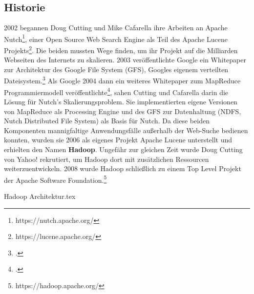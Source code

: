 \subsection{Historie}
2002 begannen Doug Cutting und Mike Cafarella ihre Arbeiten an Apache Nutch\footnote{https://nutch.apache.org/}, einer Open Source Web Search Engine als Teil des Apache Lucene Projekts\footnote{https://lucene.apache.org/}. Die beiden mussten Wege finden, um ihr Projekt auf die Milliarden Webseiten des Internets zu skalieren. 2003 veröffentlichte Google ein Whitepaper zur Architektur des Google File System (GFS), Googles eigenem verteilten Dateisystem.\footcite[The Google File System]{ghemawat_google_2003} Als Google 2004 dann ein weiteres Whitepaper zum MapReduce Programmiermodell veröffentlichte\footcite[MapReduce: Simplified Data Processing on Large Clusters]{dean_mapreduce_2004}, sahen Cutting und Cafarella darin die Lösung für Nutch's Skalierungsproblem. Sie implementierten eigene Versionen von MapReduce als Processing Engine und des GFS zur Datenhaltung (NDFS, Nutch Distributed File System) als Basis für Nutch. Da diese beiden Komponenten mannigfaltige Anwendungsfälle außerhalb der Web-Suche bedienen konnten, wurden sie 2006 als eigenes Projekt Apache Lucene unterstellt und erhielten den Namen \textbf{Hadoop}. Ungefähr zur gleichen Zeit wurde Doug Cutting von Yahoo! rekrutiert, um Hadoop dort mit zusätzlichen Ressourcen weiterzuentwickeln. 2008 wurde Hadoop schließlich zu einem Top Level Projekt der Apache Software Foundation.\footnote{https://hadoop.apache.org/}\cite{cutting_next_2016}

\begin{comment}
\section{Hadoop Versionsverlauf}
\subsection{Hadoop 1.x}
Das NDFS wurde zum Hadoop Distributed File System (HDFS) weiterentwickelt.
MapReduce war die einzige Processing Engine -> Nur große Java Applications
Scheduler der Single Point of Failure und Bottleneck

\subsection{Hadoop 2.x}
YARN als neue Ressourcenverwaltung
Haddop auf Windows
Bottleneck behoben, aber auch Möglichkeit geschaffen, ganz andere Prozesse im Cluster laufen zu lassen
In dem Fall muss man Dateien selbst aufteilen

\subsection{Hadoop 3.x}
Erasure Coding in HDFS
Support for Microsoft Azure Data Lake and Aliyun Object Storage System filesystem connectors
YARN Resource Types
\end{comment}

{Hadoop Architektur.tex}

